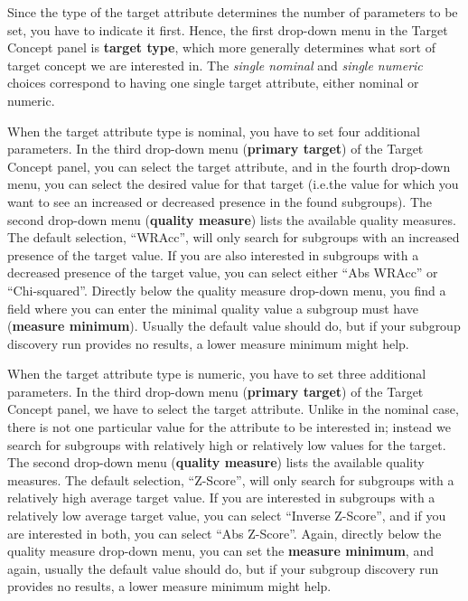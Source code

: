 \documentclass{article}
\begin{document}
Since the \gls{type} of the target attribute determines the number of
parameters to be set, you have to indicate it first.  Hence, the first
drop-down menu in the Target Concept panel is {\bf target type}, which more
generally determines what sort of target concept we are interested in.  The
\emph{single nominal} and \emph{single numeric} choices correspond to having
one single target attribute, either nominal or numeric.

When the target attribute type is \gls{nominal}, you have to set four
additional parameters.  In the third drop-down menu (\textbf{primary
target}) of the Target Concept panel, you can select the target attribute,
and in the fourth drop-down menu, you can select the desired value for that
target (i.e.\@ the value for which you want to see an increased or
decreased presence in the found subgroups).  
The second drop-down menu (\textbf{quality measure}) lists the available
quality measures.  The default selection, ``WRAcc'', will only search for
subgroups with an increased presence of the target value.  If you are also
interested in subgroups with a decreased presence of the target value, you
can select either ``Abs WRAcc'' or ``Chi-squared''. Directly below the
quality measure drop-down menu, you find a field where you can enter the
minimal quality value a subgroup must have (\textbf{measure minimum}).
Usually the default value should do, but if your subgroup discovery run
provides no results, a lower measure minimum might help.

When the target attribute type is \gls{numeric}, you have to set three
additional parameters.  In the third drop-down menu (\textbf{primary
target}) of the Target Concept panel, we have to select the target
attribute.  Unlike in the nominal case, there is not one particular value
for the attribute to be interested in; instead we search for subgroups with
relatively high or relatively low values for the target.  The second
drop-down menu (\textbf{quality measure}) lists the available quality
measures.  The default selection, ``Z-Score'', will only search for
subgroups with a relatively high average target value.  If you are
interested in subgroups with a relatively low average target value, you can
select ``Inverse Z-Score'', and if you are interested in both, you can
select ``Abs Z-Score''.  Again, directly below the quality measure
drop-down menu, you can set the \textbf{measure minimum}, and again, usually
the default value should do, but if your subgroup discovery run provides no
results, a lower measure minimum might help.
\end{document}
